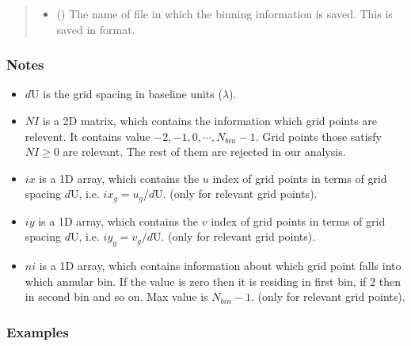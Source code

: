 \documentclass[a4paper,11pt,oneside,english,openany]{sphinxmanual}
\begin{document}
\begin{fulllineitems}
\begin{quote}
\begin{description}
\begin{itemize}
\item {} 
\sphinxAtStartPar
{} () \textendash{} The name of file in which the binning information is saved. This is saved in  format.

\end{itemize}

\end{description}\end{quote}
\subsubsection*{Notes}
\begin{itemize}
\item {} 
\sphinxAtStartPar
\(d\text{U}\) is the grid spacing in baseline units (\(\lambda\)).

\item {} 
\sphinxAtStartPar
\(N\!I\) is a 2D matrix, which contains the information which grid points are relevent. It contains value \(-2,-1,0,\cdots,N_{bin} - 1\). Grid points those satisfy \(NI \geq 0\) are relevant. The rest of them are rejected in our analysis.

\item {} 
\sphinxAtStartPar
\(ix\) is a 1D array, which contains the \(u\) index of grid points in terms of grid spacing \(d\text{U}\), i.e. \(ix_g = u_g/d\text{U}\). (only for relevant grid points).

\item {} 
\sphinxAtStartPar
\(iy\) is a 1D array, which contains the \(v\) index of grid points in terms of grid spacing \(d\text{U}\), i.e. \(iy_g = v_g/d\text{U}\). (only for relevant grid points).

\item {} 
\sphinxAtStartPar
\(ni\) is a 1D array, which contains information about which grid point falls into which annular bin. If the value is zero then it is residing in first bin, if 2 then in second bin and so on. Max value is \(N_{bin} - 1\). (only for relevant grid points).

\end{itemize}
\subsubsection*{Examples}


\end{fulllineitems}
\end{document}
